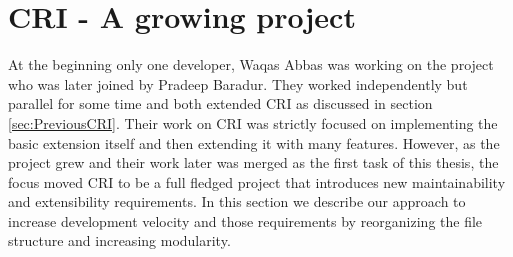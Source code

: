 \section{CRI - A growing project}
At the beginning only one developer, Waqas Abbas was working on the project who was later joined by Pradeep Baradur. They worked independently but parallel for some time and both extended CRI as discussed in section \ref{sec:PreviousCRI}. Their work on CRI was strictly focused on implementing the basic extension itself and then extending it with many features. However, as the project grew and their work later was merged as the first task of this thesis, the focus moved CRI to be a full fledged project that introduces new maintainability and extensibility requirements. In this section we describe our approach to increase development velocity and those requirements by reorganizing the file structure and increasing modularity.


